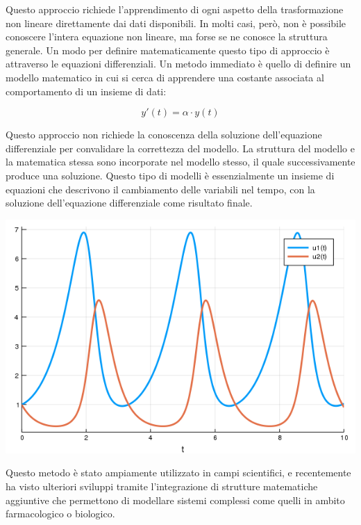 Questo approccio richiede l'apprendimento di ogni aspetto della 
trasformazione non lineare direttamente dai dati disponibili. 
In molti casi, però, non è possibile conoscere l'intera equazione non 
lineare, ma forse se ne conosce la struttura generale. Un modo per 
definire matematicamente questo tipo di approccio è attraverso le 
equazioni differenziali. Un metodo immediato è quello di definire un 
modello matematico in cui si cerca di apprendere una costante associata al 
comportamento di un insieme di dati:

$$y'(t) = \alpha \cdot y(t)$$

Questo approccio non richiede la conoscenza della soluzione dell'equazione 
differenziale per convalidare la correttezza del modello. La struttura del 
modello e la matematica stessa sono incorporate nel modello stesso, il 
quale successivamente produce una soluzione. Questo tipo di modelli è 
essenzialmente un insieme di equazioni che descrivono il cambiamento 
delle variabili nel tempo, con la soluzione dell'equazione differenziale 
come risultato finale.

\begin{minipage}{\linewidth}
    \centering
    \includegraphics[width=\textwidth]{img/lotkavolterra.png}
    \label{fig:lotkavolterra_example}
\end{minipage}

Questo metodo è stato ampiamente utilizzato in campi scientifici, e 
recentemente ha visto ulteriori sviluppi tramite l'integrazione di 
strutture matematiche aggiuntive che permettono di modellare sistemi 
complessi come quelli in ambito farmacologico o biologico.

